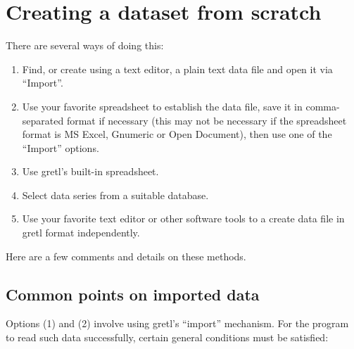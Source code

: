 \section{Creating a dataset from scratch}
\label{scratch}

There are several ways of doing this:

\begin{enumerate}
\item Find, or create using a text editor, a plain text data file and
  open it via ``Import''.
\item Use your favorite spreadsheet to establish the data file, save
  it in comma-separated format if necessary (this may not be
  necessary if the spreadsheet format is MS Excel, Gnumeric or Open
  Document), then use one of the ``Import'' options.
\item Use gretl's built-in spreadsheet.
\item Select data series from a suitable database.
\item Use your favorite text editor or other software tools to a
  create data file in gretl format independently.
\end{enumerate}

Here are a few comments and details on these methods.

\subsection{Common points on imported data}

Options (1) and (2) involve using gretl's ``import'' mechanism.
For the program to read such data successfully, certain general
conditions must be satisfied:

